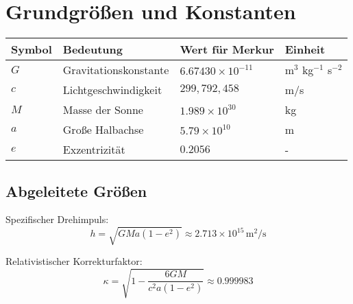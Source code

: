 \section{Grundgrößen und Konstanten}
\begin{table}[h]
\centering
\begin{tabular}{|l|l|l|l|}
\hline
\textbf{Symbol} & \textbf{Bedeutung} & \textbf{Wert für Merkur} & \textbf{Einheit} \\ \hline
$G$ & Gravitationskonstante & $6.67430 \times 10^{-11}$ & m$^3$ kg$^{-1}$ s$^{-2}$ \\ \hline
$c$ & Lichtgeschwindigkeit & $299,792,458$ & m/s \\ \hline
$M$ & Masse der Sonne & $1.989 \times 10^{30}$ & kg \\ \hline
$a$ & Große Halbachse & $5.79 \times 10^{10}$ & m \\ \hline
$e$ & Exzentrizität & $0.2056$ & - \\ \hline
\end{tabular}
\end{table}

\subsection{Abgeleitete Größen}
Spezifischer Drehimpuls:
\[
h = \sqrt{GM a (1 - e^2)} \approx 2.713 \times 10^{15} \, \text{m}^2/\text{s}
\]

Relativistischer Korrekturfaktor:
\[
\kappa = \sqrt{1 - \frac{6GM}{c^2 a (1 - e^2)}} \approx 0.999983
\]